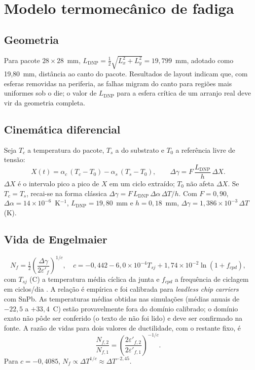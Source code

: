 \documentclass[12pt,a4paper]{article}
\newcommand{\LDNP}{L_{\mathrm{DNP}}}
\begin{document}
\section{Modelo termomecânico de fadiga}
\subsection{Geometria}
Para pacote $28\times28$~mm, $\LDNP=\tfrac12\sqrt{L_x^2+L_y^2}=19{,}799$~mm,
adotado como 19,80~mm, distância ao canto do pacote. Resultados de layout
\cite{razzaq2025} indicam que, com esferas removidas na periferia, as falhas
migram do canto para regiões mais uniformes sob o die; o valor de $\LDNP$ para
a esfera crítica de um arranjo real deve vir da geometria completa.

\subsection{Cinemática diferencial}
Seja $T_c$ a temperatura do pacote, $T_s$ a do substrato e $T_0$ a referência
livre de tensão:
\begin{equation}
X(t)=\alpha_c\,(T_c-T_0)-\alpha_s\,(T_s-T_0),\qquad
\Delta\gamma=F\,\frac{\LDNP}{h}\,\Delta X. \label{eq:X}
\end{equation}
$\Delta X$ é o intervalo pico a pico de $X$ em um ciclo extraído; $T_0$ não
afeta $\Delta X$. Se $T_c=T_s$, recai-se na forma clássica
$\Delta\gamma=F\,\LDNP\,\Delta\alpha\,\Delta T/h$.
Com $F=0{,}90$, $\Delta\alpha=14\times10^{-6}$~K$^{-1}$, $\LDNP=19{,}80$~mm e
$h=0{,}18$~mm, $\Delta\gamma=1{,}386\times10^{-3}\,\Delta T$ (K).

\subsection{Vida de Engelmaier}
\begin{equation}
N_f=\tfrac12\left(\frac{\Delta\gamma}{2\varepsilon'_f}\right)^{1/c},\quad
c=-0{,}442-6{,}0\times10^{-4}T_{sj}+1{,}74\times10^{-2}\ln(1+f_{cpd}),
\label{eq:eng}
\end{equation}
com $T_{sj}$ (\textdegree C) a temperatura média cíclica da junta e $f_{cpd}$ a
frequência de ciclagem em ciclos/dia \cite{engelmaier1983}. A relação é empírica
e foi calibrada para \emph{leadless chip carriers} com SnPb. As temperaturas
médias obtidas nas simulações (médias anuais de $-22{,}5$ a $+33{,}4$~\textdegree C)
estão provavelmente fora do domínio calibrado; o domínio exato não pôde ser
conferido (o texto de \cite{engelmaier1983} não foi lido) e deve ser confirmado
na fonte. A razão de vidas para dois valores de ductilidade, com o restante
fixo, é
\begin{equation}
\frac{N_{f,2}}{N_{f,1}}=\left(\frac{2\varepsilon'_{f,2}}{2\varepsilon'_{f,1}}\right)^{-1/c}.
\label{eq:razao}
\end{equation}
Para $c=-0{,}4085$, $N_f\propto\Delta T^{1/c}\approx\Delta T^{-2{,}45}$.
\end{document}
